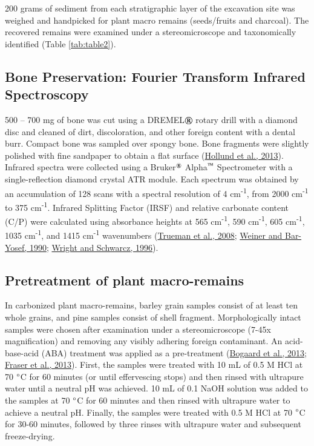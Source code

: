 \documentclass[3p]{elsarticle} %
\begin{document}
200 grams of sediment from each stratigraphic layer of the excavation site was weighed and handpicked for plant macro remains (seeds/fruits and charcoal). The recovered remains were examined under a stereomicroscope and taxonomically identified (Table \ref{tab:table2}).

\hypertarget{bone-preservation-fourier-transform-infrared-spectroscopy}{%
\subsection{Bone Preservation: Fourier Transform Infrared Spectroscopy}\label{bone-preservation-fourier-transform-infrared-spectroscopy}}

500 -- 700 mg of bone was cut using a DREMEL\(\text{\textregistered}\) rotary drill with a diamond disc and cleaned of dirt, discoloration, and other foreign content with a dental burr. Compact bone was sampled over spongy bone. Bone fragments were slightly polished with fine sandpaper to obtain a flat surface (\protect\hyperlink{ref-hollund_etal13}{Hollund et al., 2013}). Infrared spectra were collected using a Bruker\(^\text{\textregistered}\) Alpha\(^\text{\texttrademark}\) Spectrometer with a single-reflection diamond crystal ATR module. Each spectrum was obtained by an accumulation of 128 scans with a spectral resolution of 4 cm\textsuperscript{-1}, from 2000 cm\textsuperscript{-1} to 375 cm\textsuperscript{-1}. Infrared Splitting Factor (IRSF) and relative carbonate content (C/P) were calculated using absorbance heights at 565 cm\textsuperscript{-1}, 590 cm\textsuperscript{-1}, 605 cm\textsuperscript{-1}, 1035 cm\textsuperscript{-1}, and 1415 cm\textsuperscript{-1} wavenumbers (\protect\hyperlink{ref-trueman_etal08}{Trueman et al., 2008}; \protect\hyperlink{ref-weiner_bar-yosef90}{Weiner and Bar-Yosef, 1990}; \protect\hyperlink{ref-wright_schwarcz96}{Wright and Schwarcz, 1996}).

\hypertarget{pretreatment-of-plant-macro-remains}{%
\subsection{Pretreatment of plant macro-remains}\label{pretreatment-of-plant-macro-remains}}

In carbonized plant macro-remains, barley grain samples consist of at least ten whole grains, and pine samples consist of shell fragment. Morphologically intact samples were chosen after examination under a stereomicroscope (7-45x magnification) and removing any visibly adhering foreign contaminant. An acid-base-acid (ABA) treatment was applied as a pre-treatment (\protect\hyperlink{ref-bogaard_etal13}{Bogaard et al., 2013}; \protect\hyperlink{ref-fraser_etal13a}{Fraser et al., 2013}). First, the samples were treated with 10 mL of 0.5 M HCl at 70 \(\text{\textdegree}\)C for 60 minutes (or until effervescing stops) and then rinsed with ultrapure water until a neutral pH was achieved. 10 mL of 0.1 NaOH solution was added to the samples at 70 \(\text{\textdegree}\)C for 60 minutes and then rinsed with ultrapure water to achieve a neutral pH. Finally, the samples were treated with 0.5 M HCl at 70 \(\text{\textdegree}\)C for 30-60 minutes, followed by three rinses with ultrapure water and subsequent freeze-drying.
\end{document}
